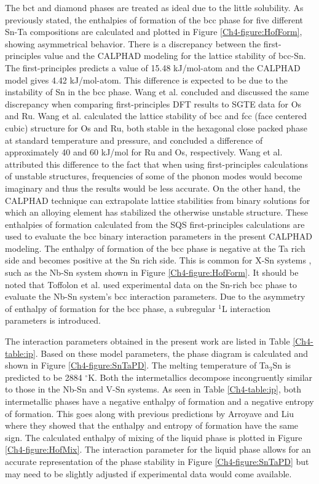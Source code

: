 The bct and diamond phases are treated as ideal due to the little solubility. As previously stated, the enthalpies of formation of the bcc phase for five different Sn-Ta compositions are calculated and plotted in Figure \ref{Ch4-figure:HofForm}, showing asymmetrical behavior. There is a discrepancy between the first-principles value and the CALPHAD modeling for the lattice stability of bcc-Sn. The first-principles predicts a value of 15.48 kJ/mol-atom and the CALPHAD model gives 4.42 kJ/mol-atom. This difference is expected to be due to the instability of Sn in the bcc phase. Wang et al. \cite{Wang2004a} concluded and discussed the same discrepancy when comparing first-principles DFT results to SGTE data for Os and Ru. Wang et al. calculated the lattice stability of bcc and fcc (face centered cubic) structure for Os and Ru, both stable in the hexagonal close packed phase at standard temperature and pressure, and concluded a difference of approximately 40 and 60 kJ/mol for Ru and Os, respectively. Wang et al. attributed this difference to the fact that when using first-principles calculations of unstable structures, frequencies of some of the phonon modes would become imaginary and thus the results would be less accurate. On the other hand, the CALPHAD technique can extrapolate lattice stabilities from binary solutions for which an alloying element has stabilized the otherwise unstable structure. These enthalpies of formation calculated from the SQS first-principles calculations are used to evaluate the bcc binary interaction parameters in the present CALPHAD modeling. The enthalpy of formation of the bcc phase is negative at the Ta rich side and becomes positive at the Sn rich side. This is common for X-Sn systems \cite{Yue2009,Toffolon2002}, such as the Nb-Sn system \cite{Toffolon2002} shown in Figure \ref{Ch4-figure:HofForm}. It should be noted that Toffolon et al. \cite{Toffolon1998,Toffolon2002} used experimental data on the Sn-rich bcc phase to evaluate the Nb-Sn system's bcc interaction parameters. Due to the asymmetry of enthalpy of formation for the bcc phase, a subregular $^1$L interaction parameters is introduced. 

The interaction parameters obtained in the present work are listed in Table \ref{Ch4-table:ip}. Based on these model parameters, the phase diagram is calculated and shown in Figure \ref{Ch4-figure:SnTaPD}. The melting temperature of Ta$_3$Sn is predicted to be 2884 $^\circ$K. Both the intermetallics decompose incongruently similar to those in the Nb-Sn and V-Sn systems. As seen in Table \ref{Ch4-table:ip}, both intermetallic phases have a negative enthalpy of formation and a negative entropy of formation. This goes along with previous predictions by Arroyave and Liu \cite{Arroyave2006} where they showed that the enthalpy and entropy of formation have the same sign. The calculated enthalpy of mixing of the liquid phase is plotted in Figure \ref{Ch4-figure:HofMix}. The interaction parameter for the liquid phase allows for an accurate representation of the phase stability in Figure \ref{Ch4-figure:SnTaPD} but may need to be slightly adjusted if experimental data would come available.

